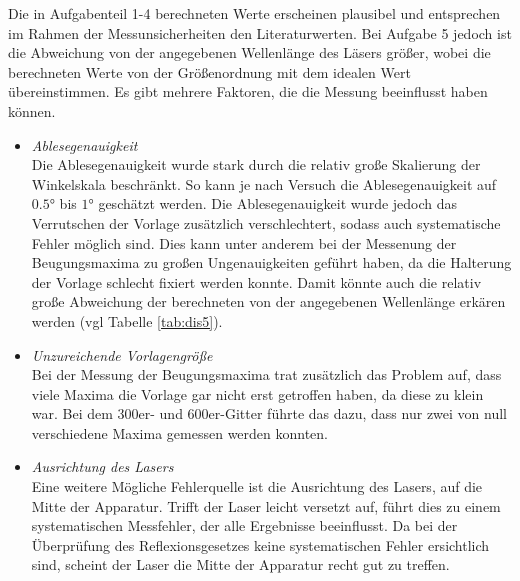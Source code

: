 Die in Aufgabenteil 1-4 berechneten Werte erscheinen plausibel und entsprechen im Rahmen der Messunsicherheiten
den Literaturwerten. Bei Aufgabe 5 jedoch ist die Abweichung von der angegebenen Wellenlänge des Läsers größer,
wobei die berechneten Werte von der Größenordnung mit dem idealen Wert übereinstimmen.
Es gibt mehrere Faktoren, die die Messung beeinflusst haben können.
\begin{itemize}
    \item \textit{Ablesegenauigkeit}
    \\\noindent
        Die Ablesegenauigkeit wurde stark durch die relativ große Skalierung der Winkelskala beschränkt.
        So kann je nach Versuch die Ablesegenauigkeit auf $\num{0.5}°$ bis $\num{1}°$ geschätzt werden.
        Die Ablesegenauigkeit wurde jedoch das Verrutschen der Vorlage zusätzlich verschlechtert, sodass
        auch systematische Fehler möglich sind. Dies kann unter anderem bei der Messenung der Beugungsmaxima
        zu großen Ungenauigkeiten geführt haben, da die Halterung der Vorlage schlecht fixiert werden konnte.
        Damit könnte auch die relativ große Abweichung der berechneten von der angegebenen Wellenlänge
        erkären werden (vgl Tabelle \ref{tab:dis5}).
    \item \textit{Unzureichende Vorlagengröße}
    \\\noindent
        Bei der Messung der Beugungsmaxima trat zusätzlich das Problem auf, dass viele Maxima die Vorlage
        gar nicht erst getroffen haben, da diese zu klein war. Bei dem 300er- und 600er-Gitter führte das dazu,
        dass nur zwei von null verschiedene Maxima gemessen werden konnten.
    \item \textit{Ausrichtung des Lasers}
    \\\noindent
        Eine weitere Mögliche Fehlerquelle ist die Ausrichtung des Lasers, auf die Mitte der Apparatur. Trifft
        der Laser leicht versetzt auf, führt dies zu einem systematischen Messfehler, der alle Ergebnisse
        beeinflusst. Da bei der Überprüfung des Reflexionsgesetzes keine systematischen Fehler ersichtlich sind,
        scheint der Laser die Mitte der Apparatur recht gut zu treffen.
\end{itemize}

